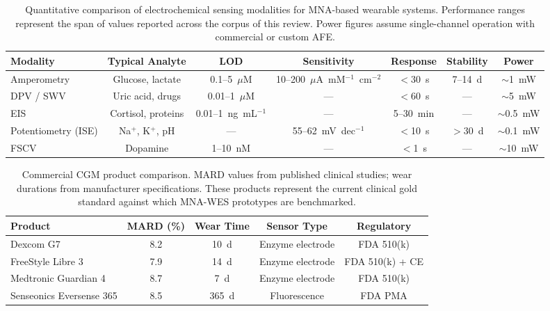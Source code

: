 \documentclass[review,1p]{elsarticle}
\begin{document}
\begin{table}[htbp]
\centering
\small
\caption{Quantitative comparison of electrochemical sensing modalities for MNA-based wearable systems. Performance ranges represent the span of values reported across the corpus of this review. Power figures assume single-channel operation with commercial or custom AFE.}
\label{tab:modality_comparison}
\begin{tabular}{p{2.2cm}cccccc}
\toprule
\textbf{Modality} & \textbf{Typical Analyte} & \textbf{LOD} & \textbf{Sensitivity} & \textbf{Response} & \textbf{Stability} & \textbf{Power} \\
\midrule
Amperometry & Glucose, lactate & 0.1--5~$\mu$M & 10--200~$\mu$A~mM$^{-1}$~cm$^{-2}$ & $<$30~s & 7--14~d & $\sim$1~mW \\
DPV / SWV & Uric acid, drugs & 0.01--1~$\mu$M & --- & $<$60~s & --- & $\sim$5~mW \\
EIS & Cortisol, proteins & 0.01--1~ng~mL$^{-1}$ & --- & 5--30~min & --- & $\sim$0.5~mW \\
Potentiometry (ISE) & Na$^+$, K$^+$, pH & --- & 55--62~mV~dec$^{-1}$ & $<$10~s & $>$30~d & $\sim$0.1~mW \\
FSCV & Dopamine & 1--10~nM & --- & $<$1~s & --- & $\sim$10~mW \\
\bottomrule
\end{tabular}
\end{table}

\begin{table}[htbp]
\centering
\small
\caption{Commercial CGM product comparison. MARD values from published clinical studies; wear durations from manufacturer specifications. These products represent the current clinical gold standard against which MNA-WES prototypes are benchmarked.}
\label{tab:commercial}
\begin{tabular}{lcccc}
\toprule
\textbf{Product} & \textbf{MARD (\%)} & \textbf{Wear Time} & \textbf{Sensor Type} & \textbf{Regulatory} \\
\midrule
Dexcom G7 & 8.2 & 10~d & Enzyme electrode & FDA 510(k) \\
FreeStyle Libre 3 & 7.9 & 14~d & Enzyme electrode & FDA 510(k) + CE \\
Medtronic Guardian 4 & 8.7 & 7~d & Enzyme electrode & FDA 510(k) \\
Senseonics Eversense 365 & 8.5 & 365~d & Fluorescence & FDA PMA \\
\bottomrule
\end{tabular}
\end{table}
\end{document}
